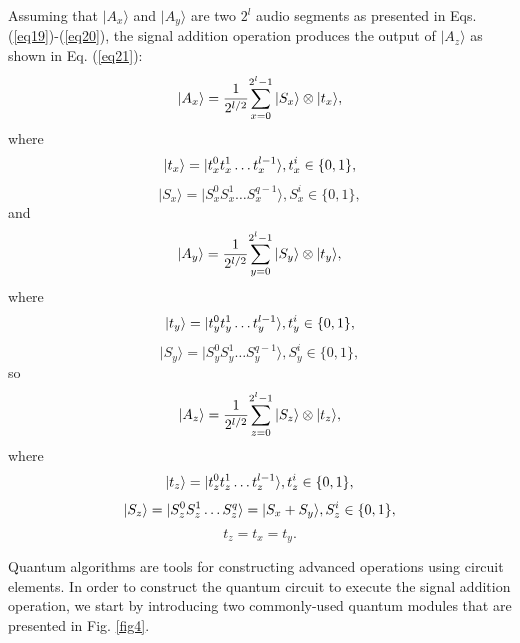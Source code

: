 \documentclass[10pt,journal,compsoc]{IEEEtran}
\begin{document}
Assuming that $\vert A_x \rangle$ and $\vert A_y \rangle$ are two $2^l$ audio segments as presented in Eqs. (\ref{eq19})-(\ref{eq20}), the signal addition operation produces the output of $\vert A_z \rangle$ as shown in Eq. (\ref{eq21}):
\begin{equation}\label{eq19}
\vert A_x \rangle = {1\over 2^{l/2}}{\sum_{x=0}^{2^{l} - 1}{\vert S_x\rangle}\otimes \vert t_x\rangle}, \notag
\end{equation}
where
\begin{equation}
\vert t_x \rangle = \vert t_x^0t_x^1\ldots t_x^{l-1} \rangle, t_x^i\in\{0, 1\}, \notag
\end{equation}
\begin{equation}
\vert S_x \rangle = \vert S_x^0S_x^1\ldots S_x^{q-1} \rangle, S_x^i \in\{0, 1\},
\end{equation}
and
\begin{equation}\label{eq20}
\vert A_y \rangle = {1\over 2^{l/2}}{\sum_{y=0}^{2^{l} - 1}{\vert S_y\rangle}\otimes \vert t_y\rangle}, \notag
\end{equation}
where
\begin{equation}
\vert t_y \rangle = \vert t_y^0t_y^1\ldots t_y^{l-1} \rangle, t_y^i\in\{0, 1\}, \notag
\end{equation}
\begin{equation}
\vert S_y \rangle = \vert S_y^0S_y^1\ldots S_y^{q-1} \rangle, S_y^i \in\{0, 1\},
\end{equation}
so
\begin{equation}\label{eq21}
\vert A_z \rangle = {1\over 2^{l/2}}{\sum_{z=0}^{2^{l} - 1}{\vert S_z\rangle}\otimes \vert t_z\rangle}, \notag
\end{equation}
where
\begin{equation}
\vert t_z \rangle = \vert t_z^0t_z^1\ldots t_z^{l-1} \rangle, t_z^i\in\{0, 1\}, \notag
\end{equation}
\begin{equation}
\vert S_z \rangle = \vert S_z^0S_z^1\ldots S_z^{q}\rangle = \vert S_x + S_y \rangle, S_z^i \in\{0, 1\}, \notag
\end{equation}
\begin{equation}
t_z = t_x = t_y.
\end{equation}

Quantum algorithms are tools for constructing advanced operations using circuit elements. In order to construct the quantum circuit to execute the signal addition operation, we start by introducing two commonly-used quantum modules that are presented in Fig. \ref{fig4}.
\end{document}
